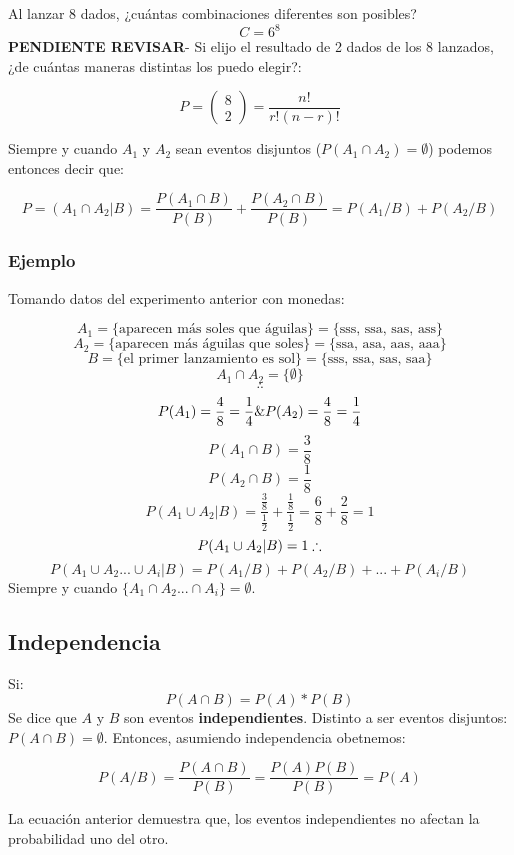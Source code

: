 \documentclass[]{book}
\begin{document}
Al lanzar 8 dados, ¿cuántas combinaciones diferentes son posibles?
\[C = 6^8\] \textbf{PENDIENTE REVISAR}- Si elijo el resultado de 2 dados
de los 8 lanzados, ¿de cuántas maneras distintas los puedo elegir?:

\[P = \left( \begin{array}{c} 8 \\ 2 \end{array} \right) = \frac {n!}{r!(n-r)!}\]

Siempre y cuando \(A_1\) y \(A_2\) sean eventos disjuntos
(\(P(A_1\cap A_2) = \emptyset\)) podemos entonces decir que:

\[P = (A_1 \cap A_2 \vert B) = \frac {P(A_1 \cap B)}{P(B)}+ \frac {P(A_2 \cap B)}{P(B)} = P(A_1/B) + P(A_2/B)\]

\subsubsection{Ejemplo}\label{ejemplo-3}

Tomando datos del experimento anterior con monedas:

\[A_1 = \{\text{aparecen más soles que águilas}\} = \{\text{sss, ssa, sas, ass}\}\]
\[A_2 = \{\text{aparecen más águilas que soles}\} = \{\text{ssa, asa, aas, aaa}\}\]
\[B = \{\text{el primer lanzamiento es sol}\} = \{\text{sss, ssa, sas, saa}\}\]
\[A_1 \cap A_2 = \{\emptyset\}\] \[\therefore\]
\[P(A_1) = \frac {4}{8} = \frac {1}{4}\space \& \space P(A_2) = \frac {4}{8} = \frac {1}{4}\]
\[P(A_1\cap B) = \frac{3}{8}\] \[P(A_2\cap B) = \frac{1}{8}\]
\[P(A_1\cup A_2\vert B) = \frac {\frac{3}{8}}{\frac{1}{2}} + \frac{\frac{1}{8}}{\frac{1}{2}} = \frac{6}{8} + \frac{2}{8} = 1\]
\[P(A_1\cup A_2\vert B) = 1 \space \therefore\]
\[P(A_1\cup A_2...\cup A_i \vert B) = P(A_1/B) + P(A_2/B)+...+ P(A_i/B)\]
Siempre y cuando \(\{A_1\cap A_2...\cap A_i\}= \emptyset\).

\subsection{Independencia}\label{independencia-1}

Si: \[P(A\cap B) = P(A)*P(B)\] Se dice que \(A\) y \(B\) son eventos
\textbf{independientes}. Distinto a ser eventos disjuntos:
\(P(A\cap B) = \emptyset\). Entonces, asumiendo independencia obetnemos:

\[P(A/B) = \frac {P(A\cap B)}{P(B)} = \frac{P(A)P(B)}{P(B)} = P(A)\]

La ecuación anterior demuestra que, los eventos independientes no
afectan la probabilidad uno del otro.
\end{document}
